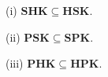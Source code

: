 (i) $\mathbf{SHK} \subseteq \mathbf{HSK}$.

(ii) $\mathbf{PSK} \subseteq \mathbf{SPK}$.

(iii) $\mathbf{PHK} \subseteq \mathbf{HPK}$.
